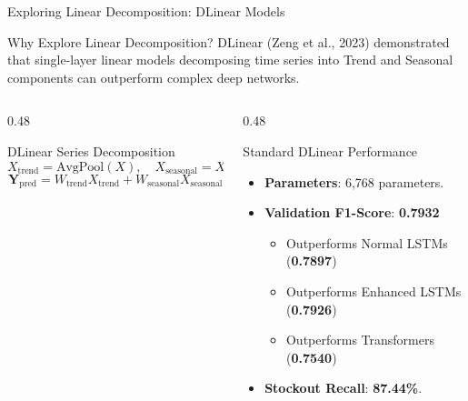 \documentclass[10pt, aspectratio=169]{beamer}
\begin{document}
\begin{frame}{Exploring Linear Decomposition: DLinear Models}
  \begin{block}{Why Explore Linear Decomposition?}
    DLinear (Zeng et al., 2023) demonstrated that single-layer linear models decomposing time series into Trend and Seasonal components can outperform complex deep networks.
  \end{block}

  \begin{columns}[T]
    \begin{column}{0.48\textwidth}
      \begin{block}{DLinear Series Decomposition}
        $$X_{\text{trend}} = \text{AvgPool}(X), \quad X_{\text{seasonal}} = X - X_{\text{trend}}$$
        $$\mathbf{Y}_{\text{pred}} = W_{\text{trend}} X_{\text{trend}} + W_{\text{seasonal}} X_{\text{seasonal}}$$
      \end{block}
    \end{column}
    
    \begin{column}{0.48\textwidth}
      \begin{block}{Standard DLinear Performance}
        \begin{itemize}
          \item \textbf{Parameters}: 6,768 parameters.
          \item \textbf{Validation F1-Score}: \textbf{0.7932}
            \begin{itemize}
              \item Outperforms Normal LSTMs (\textbf{0.7897})
              \item Outperforms Enhanced LSTMs (\textbf{0.7926})
              \item Outperforms Transformers (\textbf{0.7540})
            \end{itemize}
          \item \textbf{Stockout Recall}: \textbf{87.44\%}.
        \end{itemize}
      \end{block}
    \end{column}
  \end{columns}
\end{frame}
\end{document}

